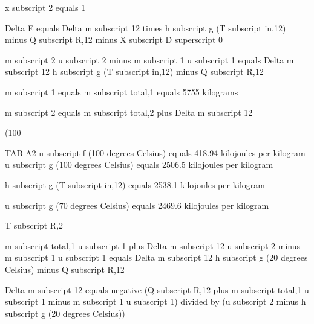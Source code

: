 x subscript 2 equals 1  

Delta E equals Delta m subscript 12 times h subscript g (T subscript in,12) minus Q subscript R,12 minus X subscript D superscript 0  

m subscript 2 u subscript 2 minus m subscript 1 u subscript 1 equals Delta m subscript 12 h subscript g (T subscript in,12) minus Q subscript R,12  

m subscript 1 equals m subscript total,1 equals 5755 kilograms  

m subscript 2 equals m subscript total,2 plus Delta m subscript 12  

(100%

TAB A2  
u subscript f (100 degrees Celsius) equals 418.94 kilojoules per kilogram  
u subscript g (100 degrees Celsius) equals 2506.5 kilojoules per kilogram  

h subscript g (T subscript in,12) equals 2538.1 kilojoules per kilogram  

u subscript g (70 degrees Celsius) equals 2469.6 kilojoules per kilogram  

T subscript R,2  

m subscript total,1 u subscript 1 plus Delta m subscript 12 u subscript 2 minus m subscript 1 u subscript 1 equals Delta m subscript 12 h subscript g (20 degrees Celsius) minus Q subscript R,12  

Delta m subscript 12 equals negative (Q subscript R,12 plus m subscript total,1 u subscript 1 minus m subscript 1 u subscript 1) divided by (u subscript 2 minus h subscript g (20 degrees Celsius))